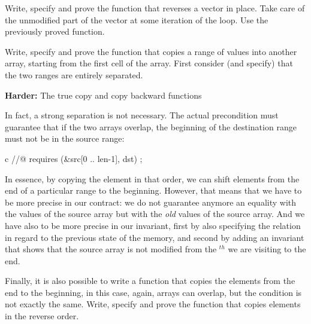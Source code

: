 Write, specify and prove the function that reverses a vector in place. Take
care of the unmodified part of the vector at some iteration of the loop.
Use the previously proved  function.






Write, specify and prove the function  that copies a range
of values into another array, starting from the first cell of the array.
First consider (and specify) that the two ranges are entirely separated.




\textbf{Harder:} The true copy and copy backward functions

In fact, a strong separation is not necessary. The actual precondition must
guarantee that if the two arrays overlap, the beginning of the destination
range must not be in the source range:

\begin{CodeBlock}{c}
//@ requires \separated(&src[0 .. len-1], dst) ;
\end{CodeBlock}


In essence, by copying the element in that order, we can shift elements from
the end of a particular range to the beginning. However, that means that we
have to be more precise in our contract: we do not guarantee anymore an equality
with the values of the source array but with the \emph{old} values of the
source array. And we have also to be more precise in our invariant, first by
also specifying the relation in regard to the previous state of the memory, and
second by adding an invariant that shows that the source array is not modified
from the $^{th}$ we are visiting to the end.


Finally, it is also possible to write a function that copies the elements from
the end to the beginning, in this case, again, arrays can overlap, but the
condition is not exactly the same. Write, specify and prove the function
 that copies elements in the reverse order.
